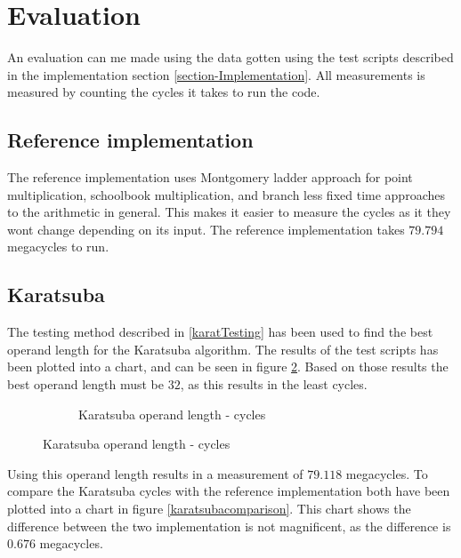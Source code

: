 \section{Evaluation}
An evaluation can me made using the data gotten using the test scripts described in the implementation section \ref{section-Implementation}. All measurements is measured by counting the cycles it takes to run the code.

\subsection{Reference implementation}
The reference implementation uses Montgomery ladder approach for point multiplication, schoolbook multiplication, and branch less fixed time approaches to the arithmetic in general. This makes it easier to measure the cycles as it they wont change depending on its input. The reference implementation takes $79.794$ megacycles to run.

\subsection{Karatsuba}
The testing method described in \ref{karatTesting} has been used to find the best operand length for the Karatsuba algorithm. The results of the test scripts has been plotted into a chart, and can be seen in figure \ref{karatsubafigure}. Based on those results the best operand length must be $32$, as this results in the least cycles. \\ 
\begin{figure}[H]
\begin{subfigure}{\textwidth}
    \centering
    \caption{Karatsuba operand length - cycles}
\label{karatsubafigure}
\end{subfigure}
\end{figure}
Using this operand length results in a measurement of $79.118$ megacycles. To compare the Karatsuba cycles with the reference implementation both have been plotted into a chart in figure \ref{karatsubacomparison}. This chart shows the difference between the two implementation is not magnificent, as the difference is $0.676$ megacycles.\\


